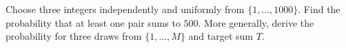 Choose three integers independently and uniformly from $\{1,\ldots,1000\}$. Find the probability that at least one pair sums to $500$. More generally, derive the probability for three draws from $\{1,\ldots,M\}$ and target sum $T$.
